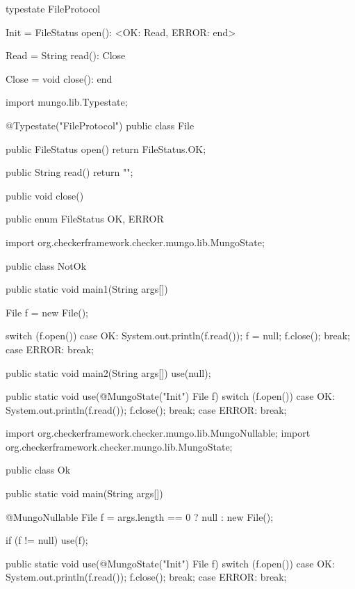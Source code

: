 \begin{code}
typestate FileProtocol {

  Init = {
    FileStatus open(): <OK: Read, ERROR: end>
  }

  Read = {
    String read(): Close
  }

  Close = {
    void close(): end
  }

}\end{code}

\begin{code}
import mungo.lib.Typestate;

@Typestate("FileProtocol")
public class File {

  public FileStatus open() {
    return FileStatus.OK;
  }

  public String read() {
    return "";
  }

  public void close() {

  }

}\end{code}

\begin{code}
public enum FileStatus {
  OK, ERROR
}\end{code}

\begin{code}
import org.checkerframework.checker.mungo.lib.MungoState;

public class NotOk {
  public static void main1(String args[]) {
    File f = new File();

    switch (f.open()) {
      case OK:
        System.out.println(f.read());
        f = null;
        f.close();
        break;
      case ERROR:
        break;
    }
  }

  public static void main2(String args[]) {
    use(null);
  }

  public static void use(@MungoState("Init") File f) {
    switch (f.open()) {
      case OK:
        System.out.println(f.read());
        f.close();
        break;
      case ERROR:
        break;
    }
  }
}\end{code}

\begin{code}
import org.checkerframework.checker.mungo.lib.MungoNullable;
import org.checkerframework.checker.mungo.lib.MungoState;

public class Ok {
  public static void main(String args[]) {
    @MungoNullable File f = args.length == 0 ? null : new File();

    if (f != null) {
      use(f);
    }
  }
  
  public static void use(@MungoState("Init") File f) {
    switch (f.open()) {
      case OK:
        System.out.println(f.read());
        f.close();
        break;
      case ERROR:
        break;
    }
  }
}\end{code}

